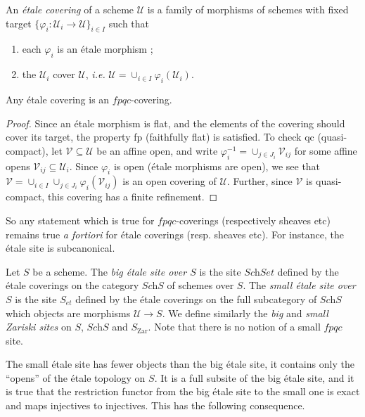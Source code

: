 \begin{definition}
An \emph{\'etale covering} of a scheme $\mathcal{U}$ is a family of morphisms of schemes with fixed target $\{ \varphi_i : \mathcal{U}_i \to \mathcal{U} \}_{i \in I}$ such that 
\begin{enumerate}
\item each $\varphi_i$ is an \'etale morphism ;
\item the $\mathcal{U}_i$ cover $\mathcal{U}$, {\it i.e.} $\mathcal{U} = \cup_{i\in I}\varphi_i(\mathcal{U}_i)$.
\end{enumerate}
\end{definition}

\begin{lemma}
Any \'etale covering is an $fpqc$-covering. 
\end{lemma}

\begin{proof}
Since an \'etale morphism is flat, and the elements of the covering should cover its target, the property fp (faithfully flat) is satisfied. To check qc (quasi-compact), let $\mathcal{V} \subseteq \mathcal{U}$ be an affine open, and write $\varphi_i^{-1} = \cup_{j \in J_i} \mathcal{V}_{ij}$ for some affine opens $\mathcal{V}_{ij} \subseteq \mathcal{U}_i$. Since $\varphi_i$ is open (\'etale morphisms are open), we see that $\mathcal{V} = \cup_{i\in I}\cup_{j \in J_i} \varphi_i(\mathcal{V}_{ij})$ is an open covering of $\mathcal{U}$. Further, since $\mathcal{V}$ is quasi-compact, this covering has a finite refinement.
\end{proof}

So any statement which is true for $fpqc$-coverings (respectively sheaves etc) remains true {\it a fortiori} for \'etale coverings (resp. sheaves etc). For instance, the \'etale site is subcanonical.

\begin{definition}
Let $S$ be a scheme. The \emph{big \'etale site over $S$} is the site $\textit{Sch}Set$ defined by the \'etale coverings on the category $\textit{Sch}S$ of schemes over $S$. The \emph{small \'etale site over $S$} is the site $S_{et}$ defined by the \'etale coverings on the full subcategory of $\textit{Sch}S$ which objects are morphisms $\mathcal{U} \to S$. We define similarly the \emph{big} and \emph{small Zariski sites} on $S$, $\textit{Sch}S$ and $S_\mathrm{Zar}$. Note that there is no notion of a small $fpqc$ site.
\end{definition}

The small \'etale site has fewer objects than the big \'etale site, it contains only the ``opens'' of the \'etale topology on $S$. It is a full subsite of the big \'etale site, and it is true that the restriction functor from the big \'etale site to the small one is exact and maps injectives to injectives. This has the following consequence.

